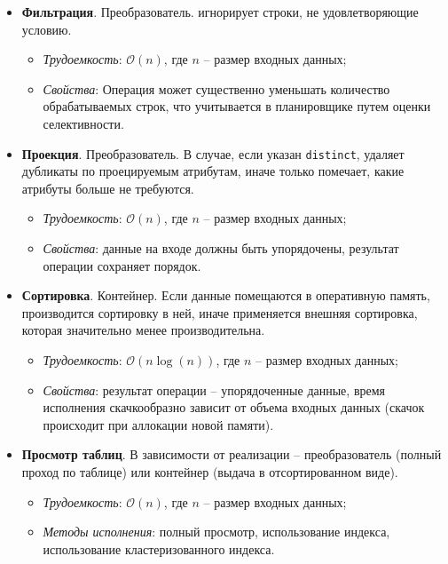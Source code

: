 \begin{itemize}
	\item \textbf{Фильтрация}. Преобразователь. игнорирует строки, не удовлетворяющие условию.
	      \begin{itemize}
		      \item \textit{Трудоемкость}: $\mathcal{O}(n)$, где $n$ -- размер входных данных;
		      \item \textit{Свойства}: Операция может существенно уменьшать количество обрабатываемых
		            строк, что учитывается в планировщике путем оценки селективности.
	      \end{itemize}
	\item \textbf{Проекция}. Преобразователь. В случае, если указан \texttt{distinct}, удаляет
	      дубликаты по проецируемым атрибутам, иначе только помечает, какие атрибуты больше не требуются.
	      \begin{itemize}
		      \item \textit{Трудоемкость}: $\mathcal{O}(n)$, где $n$ -- размер входных данных;
		      \item \textit{Свойства}: данные на входе должны быть упорядочены, результат операции
		            сохраняет порядок.
	      \end{itemize}
	\item \textbf{Сортировка}. Контейнер. Если данные помещаются в оперативную память, производится
	      сортировку в ней, иначе применяется внешняя сортировка, которая значительно менее производительна.
	      \begin{itemize}
		      \item \textit{Трудоемкость}: $\mathcal{O}(n \log(n))$, где $n$ -- размер входных данных;
		      \item \textit{Свойства}: результат операции -- упорядоченные данные, время исполнения
		            скачкообразно зависит от объема входных данных (скачок происходит при аллокации новой памяти).
	      \end{itemize}
	\item \textbf{Просмотр таблиц}. В зависимости от реализации -- преобразователь (полный проход
	      по таблице) или контейнер (выдача в отсортированном виде).
	      \begin{itemize}
		      \item \textit{Трудоемкость}: $\mathcal{O}(n)$, где $n$ -- размер входных данных;
		      \item \textit{Методы исполнения}: полный просмотр, использование индекса,
		            использование кластеризованного индекса.
	      \end{itemize}
\end{itemize}

